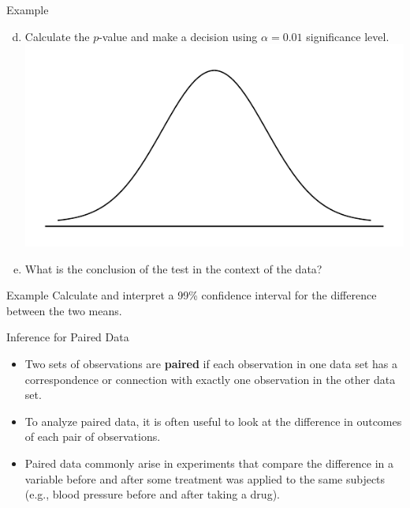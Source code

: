 \documentclass[10pt, fleqn]{beamer}
\begin{document}
\begin{frame}{Example}
\begin{enumerate}[(a)]
\setcounter{enumi}{3}
\item Calculate the $p$-value and make a decision using $\alpha = 0.01$ significance level.\\
\includegraphics[scale=0.35]{norm_draw.pdf}
\vspace{0.75cm}
\item What is the conclusion of the test in the context of the data?
\vspace{3.5cm}
\end{enumerate}
\end{frame}

\begin{frame}{Example}
\vspace{-4.75cm}
Calculate and interpret a 99\% confidence interval for the difference between the two means.
\end{frame}

\begin{frame}{Inference for Paired Data}
\begin{itemize}
\item Two sets of observations are \textbf{paired} if each observation in one data set has a correspondence or connection with exactly one observation in the other data set.
\vspace{10pt}
\item To analyze paired data, it is often useful to look at the difference in outcomes of each pair of observations.
\vspace{10pt}
\item Paired data commonly arise in experiments that compare the difference in a variable before and after some treatment was applied to the same subjects (e.g., blood pressure before and after taking a drug).
\end{itemize}
\end{frame}
\end{document}
